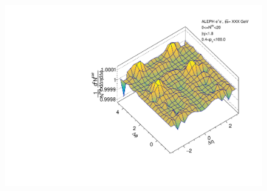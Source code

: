 \begin{figure}[htbp]
\begin{minipage}[b]{0.32\linewidth}
    \label{fig:LEP2 Beam Axis, Ratio Plot, Multiplicity 0-20, Anthony}
  \end{minipage}
  \begin{minipage}[b]{0.32\linewidth}
    \centering
    \includegraphics[width=\linewidth]{images/TwoParticleCorrelation/LEP2_BEAM/LEP2_BEAM_r_ratio_0_20.pdf}
    \label{fig:LEP2 Beam Axis, Ratio Plot, Multiplicity 0-20, Ratio}
  \end{minipage}
\end{figure}


